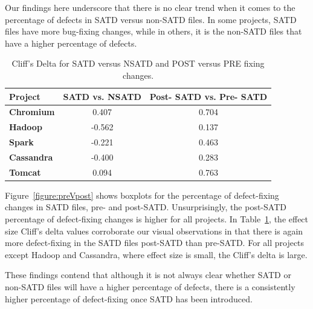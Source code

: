 Our findings here underscore that there is no clear trend when it comes to the percentage of defects in SATD versus non-SATD files. In some projects, SATD files have more bug-fixing changes, while in others, it is the non-SATD files that have a higher percentage of defects.

\begin{table}[tb]
	\setlength{\tabcolsep}{.7\tabcolsep}
	\centering
	\caption{Cliff's Delta for SATD versus NSATD and POST versus PRE fixing changes.}
	\begin{tabular}{l|c|c}
		\hline
		\textbf{Project}   & {\bf SATD vs. NSATD} & {\bf Post- SATD vs. Pre- SATD} \\ \hline
		\textbf{Chromium}  & 0.407          & 0.704        \\ \hline
		\textbf{Hadoop}    & -0.562         & 0.137        \\ \hline
		\textbf{Spark}     & -0.221         & 0.463        \\ \hline
		\textbf{Cassandra} & -0.400         & 0.283        \\ \hline
		\textbf{Tomcat}    & 0.094          & 0.763        \\ \hline
	\end{tabular}
	\label{table:cliff_deltas_RQ1}
\end{table}

 Figure~\ref{figure:preVpost} shows boxplots for the percentage of defect-fixing changes in SATD files, pre- and post-SATD. Unsurprisingly, the post-SATD percentage of defect-fixing changes is higher for all projects. In Table~\ref{table:cliff_deltas_RQ1}, the effect size Cliff's delta values corroborate our visual observations in that there is again more defect-fixing in the SATD files post-SATD than pre-SATD. For all projects except Hadoop and Cassandra, where effect size is small, the Cliff's delta is large.


These findings contend that although it is not always clear whether SATD or non-SATD files will have a higher percentage of defects, there is a consistently higher percentage of defect-fixing once SATD has been introduced.



